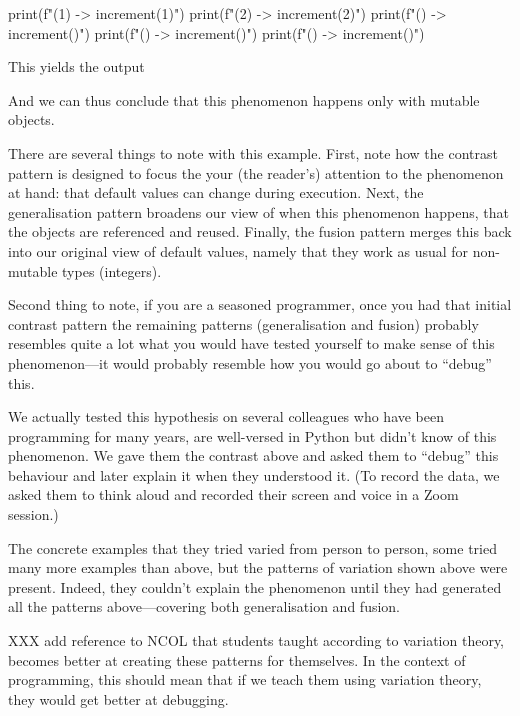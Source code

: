 \begin{description}
\begin{pyblock}[default1]
print(f"(1) -> {increment(1)}")
print(f"(2) -> {increment(2)}")
print(f"()  -> {increment()}")
print(f"()  -> {increment()}")
print(f"()  -> {increment()}")
    \end{pyblock}
    \vspace{0.5em}
    This yields the output
    \vspace{0.5em}
    \printpythontex[verbatim][highlightlines={3-5}]

    And we can thus conclude that this phenomenon happens only with mutable 
    objects.
\end{description}

There are several things to note with this example.
First, note how the contrast pattern is designed to focus the your (the 
reader's) attention to the phenomenon at hand: that default values can change 
during execution.
Next, the generalisation pattern broadens our view of when this phenomenon 
happens, that the objects are referenced and reused.
Finally, the fusion pattern merges this back into our original view of default 
values, namely that they work as usual for non-mutable types (\eg integers).

Second thing to note, if you are a seasoned programmer, once you had that 
initial contrast pattern the remaining patterns (generalisation and fusion) 
probably resembles quite a lot what you would have tested yourself to make 
sense of this phenomenon---it would probably resemble how you would go about to 
\enquote{debug} this.

We actually tested this hypothesis on several colleagues who have been 
programming for many years, are well-versed in Python but didn't know of this 
phenomenon.
We gave them the contrast above and asked them to \enquote{debug} this 
behaviour and later explain it when they understood it.
(To record the data, we asked them to think aloud and recorded their screen and 
voice in a Zoom session.)

The concrete examples that they tried varied from person to person, some tried 
many more examples than above, but the patterns of variation shown above were 
present.
Indeed, they couldn't explain the phenomenon until they had generated all the 
patterns above---covering both generalisation and fusion.

XXX add reference to NCOL that students taught according to variation theory, 
becomes better at creating these patterns for themselves.
In the context of programming, this should mean that if we teach them using 
variation theory, they would get better at debugging.

